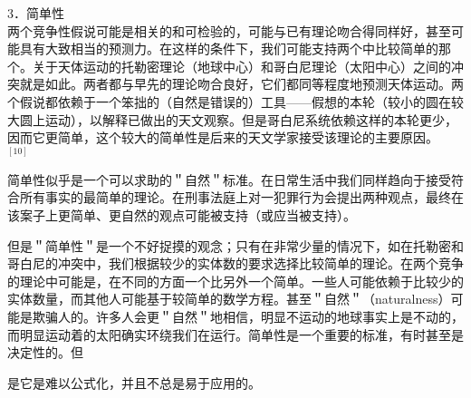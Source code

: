 3．简单性\\
两个竞争性假说可能是相关的和可检验的，可能与已有理论吻合得同样好，甚至可能具有大致相当的预测力。在这样的条件下，我们可能支持两个中比较简单的那个。关于天体运动的托勒密理论（地球中心）和哥白尼理论（太阳中心）之间的冲突就是如此。两者都与早先的理论吻合良好，它们都同等程度地预测天体运动。两个假说都依赖于一个笨拙的（自然是错误的）工具——假想的本轮（较小的圆在较大圆上运动），以解释已做出的天文观察。但是哥白尼系统依赖这样的本轮更少，因而它更简单，这个较大的简单性是后来的天文学家接受该理论的主要原因。 ${ }^{[10]}$

简单性似乎是一个可以求助的＂自然＂标准。在日常生活中我们同样趋向于接受符合所有事实的最简单的理论。在刑事法庭上对一犯罪行为会提出两种观点，最终在该案子上更简单、更自然的观点可能被支持（或应当被支持）。

但是＂简单性＂是一个不好捉摸的观念；只有在非常少量的情况下，如在托勒密和哥白尼的冲突中，我们根据较少的实体数的要求选择比较简单的理论。在两个竞争的理论中可能是，在不同的方面一个比另外一个简单。一些人可能依赖于比较少的实体数量，而其他人可能基于较简单的数学方程。甚至＂自然＂（naturalness）可能是欺骗人的。许多人会更＂自然＂地相信，明显不运动的地球事实上是不动的，而明显运动着的太阳确实环绕我们在运行。简单性是一个重要的标准，有时甚至是决定性的。但

是它是难以公式化，并且不总是易于应用的。 
